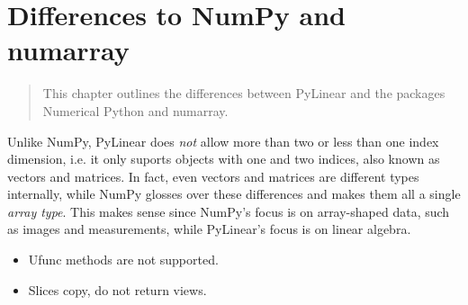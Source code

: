 \chapter{Differences to NumPy and numarray}
\label{cha:diff-pylinear-numpy}

\begin{quote}
   This chapter outlines the differences between PyLinear and the packages
   Numerical Python and numarray.
\end{quote}

Unlike NumPy, PyLinear does \emph{not} allow more than two or less
than one index dimension, i.e. it only suports objects with one and
two indices, also known as vectors and matrices. In fact, even vectors
and matrices are different types internally, while NumPy glosses over
these differences and makes them all a single \emph{array type}. This
makes sense since NumPy's focus is on array-shaped data, such as
images and measurements, while PyLinear's focus is on linear algebra.

\begin{itemize}
  \item Ufunc methods are not supported.
  \item Slices copy, do not return views.
\end{itemize}
